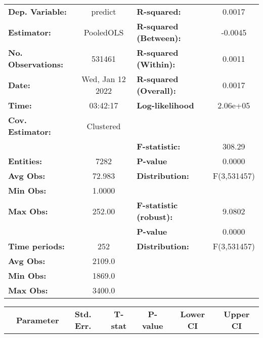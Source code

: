 \begin{center}
\begin{tabular}{lclc}
\toprule
\textbf{Dep. Variable:}    &      predict       & \textbf{  R-squared:         }   &      0.0017      \\
\textbf{Estimator:}        &     PooledOLS      & \textbf{  R-squared (Between):}  &     -0.0045      \\
\textbf{No. Observations:} &       531461       & \textbf{  R-squared (Within):}   &      0.0011      \\
\textbf{Date:}             &  Wed, Jan 12 2022  & \textbf{  R-squared (Overall):}  &      0.0017      \\
\textbf{Time:}             &      03:42:17      & \textbf{  Log-likelihood     }   &     2.06e+05     \\
\textbf{Cov. Estimator:}   &     Clustered      & \textbf{                     }   &                  \\
\textbf{}                  &                    & \textbf{  F-statistic:       }   &      308.29      \\
\textbf{Entities:}         &        7282        & \textbf{  P-value            }   &      0.0000      \\
\textbf{Avg Obs:}          &       72.983       & \textbf{  Distribution:      }   &   F(3,531457)    \\
\textbf{Min Obs:}          &       1.0000       & \textbf{                     }   &                  \\
\textbf{Max Obs:}          &       252.00       & \textbf{  F-statistic (robust):} &      9.0802      \\
\textbf{}                  &                    & \textbf{  P-value            }   &      0.0000      \\
\textbf{Time periods:}     &        252         & \textbf{  Distribution:      }   &   F(3,531457)    \\
\textbf{Avg Obs:}          &       2109.0       & \textbf{                     }   &                  \\
\textbf{Min Obs:}          &       1869.0       & \textbf{                     }   &                  \\
\textbf{Max Obs:}          &       3400.0       & \textbf{                     }   &                  \\
\bottomrule
\end{tabular}
\begin{tabular}{lcccccc}
                & \textbf{Parameter} & \textbf{Std. Err.} & \textbf{T-stat} & \textbf{P-value} & \textbf{Lower CI} & \textbf{Upper CI}  \\

\end{tabular}
\end{center}
